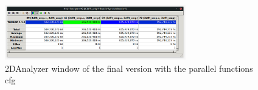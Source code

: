 \begin{figure}[H]%
    \centering
    \includegraphics[width=0.7\textwidth]{./data/omp3.jpeg}
    \caption{2DAnalyzer window of the final version with the parallel functions cfg}%
    \label{fig:omp3}
\end{figure}


